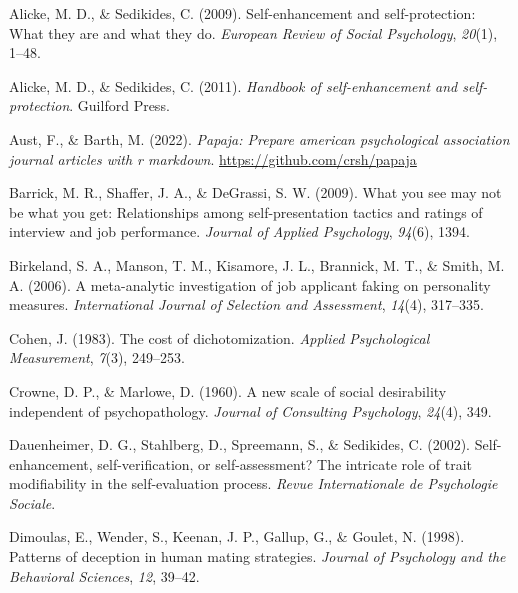 \documentclass[
  ,jou]{apa6}
\newlength{\cslhangindent}
\newlength{\cslentryspacingunit} %
\newenvironment{CSLReferences}[2] %
 {%
  \setlength{\parindent}{0pt}
  \ifodd #1
  \let\oldpar\par
  \def\par{\hangindent=\cslhangindent\oldpar}
  \fi
  \setlength{\parskip}{#2\cslentryspacingunit}
 }%
 {}
\begin{document}
\hypertarget{refs}{}
\begin{CSLReferences}{1}{0}
\leavevmode{}%
Alicke, M. D., \& Sedikides, C. (2009). Self-enhancement and self-protection: What they are and what they do. \emph{European Review of Social Psychology}, \emph{20}(1), 1--48.

\leavevmode{}%
Alicke, M. D., \& Sedikides, C. (2011). \emph{Handbook of self-enhancement and self-protection}. Guilford Press.

\leavevmode{}%
Aust, F., \& Barth, M. (2022). \emph{Papaja: Prepare american psychological association journal articles with r markdown}. \url{https://github.com/crsh/papaja}

\leavevmode{}%
Barrick, M. R., Shaffer, J. A., \& DeGrassi, S. W. (2009). What you see may not be what you get: Relationships among self-presentation tactics and ratings of interview and job performance. \emph{Journal of Applied Psychology}, \emph{94}(6), 1394.

\leavevmode{}%
Birkeland, S. A., Manson, T. M., Kisamore, J. L., Brannick, M. T., \& Smith, M. A. (2006). A meta-analytic investigation of job applicant faking on personality measures. \emph{International Journal of Selection and Assessment}, \emph{14}(4), 317--335.

\leavevmode{}%
Cohen, J. (1983). The cost of dichotomization. \emph{Applied Psychological Measurement}, \emph{7}(3), 249--253.

\leavevmode{}%
Crowne, D. P., \& Marlowe, D. (1960). A new scale of social desirability independent of psychopathology. \emph{Journal of Consulting Psychology}, \emph{24}(4), 349.

\leavevmode{}%
Dauenheimer, D. G., Stahlberg, D., Spreemann, S., \& Sedikides, C. (2002). Self-enhancement, self-verification, or self-assessment? The intricate role of trait modifiability in the self-evaluation process. \emph{Revue Internationale de Psychologie Sociale}.

\leavevmode{}%
Dimoulas, E., Wender, S., Keenan, J. P., Gallup, G., \& Goulet, N. (1998). Patterns of deception in human mating strategies. \emph{Journal of Psychology and the Behavioral Sciences}, \emph{12}, 39--42.


\end{CSLReferences}
\end{document}
